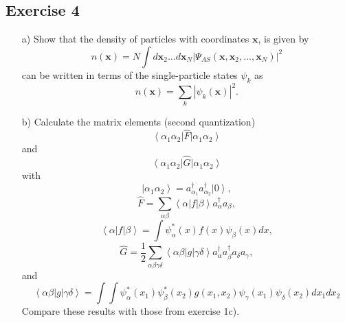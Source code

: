 \documentclass[prc]{revtex4}
\newcommand{\bra}[1]{\left\langle #1 \right|}
\newcommand{\ket}[1]{\left| #1 \right\rangle}
\begin{document}
\subsection*{Exercise 4}
\begin{enumerate}
\item[a)] Show that the density of particles with coordinates $\mathbf{x}$, is given by
\[
  n(\mathbf{x}) = N \int d\mathbf{x}_2 \dots d\mathbf{x}_N |\Psi_{AS}(\mathbf{x},\mathbf{x}_2,\dots,\mathbf{x}_N)|^2 
\]
can be written in terms of the single-particle states $\psi_k$ as 
\[
 n(\mathbf{x}) = \sum_k|\psi_k(\mathbf{x})|^2.
\]
\item[b)] Calculate the matrix elements (second quantization)
\[
\bra{\alpha_{1}\alpha_{2}}\hat{F}\ket{\alpha_{1}\alpha_{2}}
\]
and
\[
\bra{\alpha_{1}\alpha_{2}}\hat{G}\ket{\alpha_{1}\alpha_{2}}
\]
with
\[
\ket{\alpha_{1}\alpha_{2}}=a_{\alpha_{1}}^{\dagger}
a_{\alpha_{2}}^{\dagger}\ket{0} ,
\]
\[
\hat{F}=\sum_{\alpha\beta}\bra{\alpha}f\ket{\beta}
a_{\alpha}^{\dagger}a_{\beta}  ,
\]
\[
\bra{\alpha}f\ket{\beta}=\int \psi_{\alpha}^{*}(x)f(x)\psi_{\beta}(x)dx ,
\]
\[
\hat{G} = \frac{1}{2}\sum_{\alpha\beta\gamma\delta}
\bra{\alpha\beta}g\ket{\gamma\delta}
a_{\alpha}^{\dagger}a_{\beta}^{\dagger}a_{\delta}a_{\gamma} ,
\]
and
\[
\bra{\alpha\beta}g\ket{\gamma\delta}=
\int\int \psi_{\alpha}^{*}(x_{1})\psi_{\beta}^{*}(x_{2})g(x_{1},
x_{2})\psi_{\gamma}(x_{1})\psi_{\delta}(x_{2})dx_{1}dx_{2}
\]
Compare these results with those from exercise 1c).

\end{enumerate}
\end{document}
